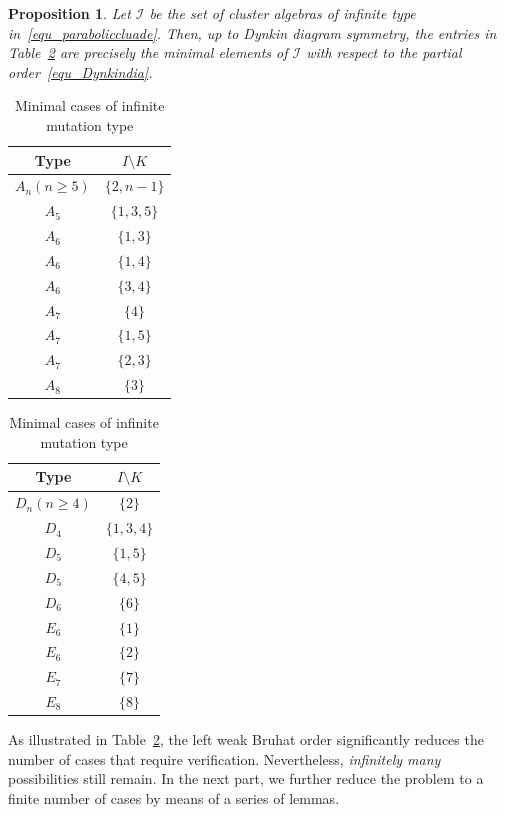\documentclass[11pt]{amsart}
\numberwithin{equation}{section}
\theoremstyle{plain}
\newtheorem{proposition}[theorem]{Proposition}
\theoremstyle{definition}
\numberwithin{equation}{section}
\begin{document}
\begin{proposition}\label{proposition_minimalelements}
Let $\mathscr{I}$ be the set of cluster algebras of infinite type in~\eqref{equ_paraboliccluade}. Then, up to Dynkin diagram symmetry, the entries in Table~\ref{table_minimalpara} are precisely the minimal elements of $\mathscr{I}$ with respect to the partial order~\eqref{equ_Dynkindia}.
\end{proposition}
\begin{table}[h]
\begin{center}
\begin{tabular}{| c | c |  }
 \hline
 Type & $I \setminus K$ \\ 
\hline  \hline
$A_n (n \geq 5)$ & $\{2, n-1\}$   \\   
\hline  
$A_5$ & $\{1, 3, 5\}$  \\
\hline     
$A_6$ & $\{1,3\}$   \\   
$A_6$ & $\{1,4\}$   \\   
$A_6$ & $\{3,4\}$   \\   
\hline 
$A_7$ & $\{4\}$   \\   
$A_7$ & $\{1,5\}$   \\   
$A_7$ & $\{2,3\}$   \\   
\hline
$A_8$ & $\{3\}$   \\   
\hline
\end{tabular}
\quad \quad
\begin{tabular}{| c | c |  }
 \hline
 Type & $I \setminus K$ \\ 
\hline  \hline
$D_n (n \geq 4)$ & $\{2\}$  \\   
\hline
$D_4$ & $\{1,3,4\}$  \\
\hline
$D_5$ & $\{1,5\}$  \\   
$D_5$ & $\{4,5\}$  \\   
\hline
$D_6$ & $\{6\}$  \\   
\hline
$E_6$ & $\{1\}$  \\   
$E_6$ & $\{2\}$  \\
\hline
$E_7$ & $\{7\}$  \\
\hline
$E_8$ & $\{8\}$  \\
\hline
\end{tabular}
\end{center}
\caption{Minimal cases of infinite mutation type}
\label{table_minimalpara}
\end{table}

As illustrated in Table~\ref{table_minimalpara}, the left weak Bruhat order significantly reduces the number of cases that require verification. Nevertheless, \emph{infinitely many} possibilities still remain. In the next part, we further reduce the problem to a finite number of cases by means of a series of lemmas.
\end{document}
